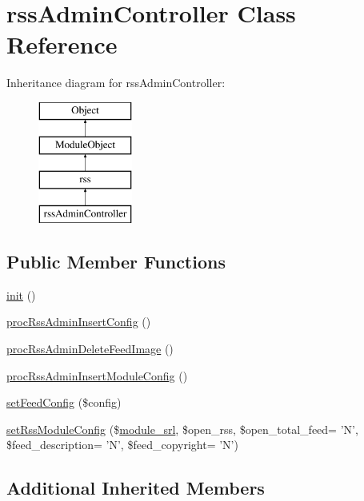 \hypertarget{classrssAdminController}{\section{rss\+Admin\+Controller Class Reference}
\label{classrssAdminController}
}
Inheritance diagram for rss\+Admin\+Controller\+:\begin{figure}[H]
\begin{center}
\leavevmode
\includegraphics[height=4.000000cm]{classrssAdminController}
\end{center}
\end{figure}
\subsection*{Public Member Functions}
\begin{DoxyCompactItemize}
\item 
\hyperlink{classrssAdminController_ad73e127c3d6191b7d82e2fd3f50ef477}{init} ()
\item 
\hyperlink{classrssAdminController_abacdc1717d07ac5cfe2d4bb83f08d310}{proc\+Rss\+Admin\+Insert\+Config} ()
\item 
\hyperlink{classrssAdminController_a37eed33f761ae0a1cdcce49562bed601}{proc\+Rss\+Admin\+Delete\+Feed\+Image} ()
\item 
\hyperlink{classrssAdminController_ae07c8748cdccb2d13dfb4140e9c13aeb}{proc\+Rss\+Admin\+Insert\+Module\+Config} ()
\item 
\hyperlink{classrssAdminController_a57c67e2413e7d6491f090975531094cd}{set\+Feed\+Config} (\$config)
\item 
\hyperlink{classrssAdminController_a4dfe5a37da285c2421b574923a5bcbf8}{set\+Rss\+Module\+Config} (\$\hyperlink{ko_8install_8php_a370bb6450fab1da3e0ed9f484a38b761}{module\+\_\+srl}, \$open\+\_\+rss, \$open\+\_\+total\+\_\+feed= 'N', \$feed\+\_\+description= 'N', \$feed\+\_\+copyright= 'N')
\end{DoxyCompactItemize}
\subsection*{Additional Inherited Members}


